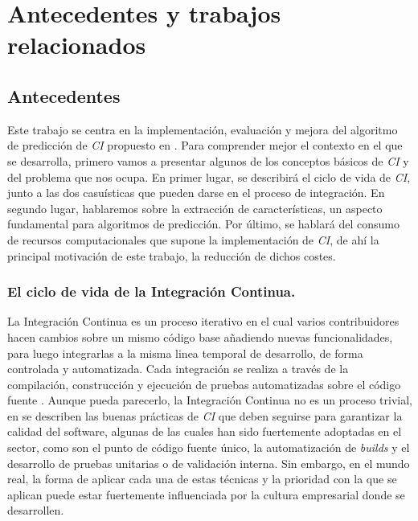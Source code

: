 \section{Antecedentes y trabajos relacionados}
\subsection{Antecedentes}
Este trabajo se centra en la implementación, evaluación y mejora del algoritmo de predicción de
\textit{CI} propuesto en \cite{2}. Para comprender mejor el contexto en el que se desarrolla,
primero vamos a presentar algunos de los conceptos básicos de \textit{CI} y del problema que
nos ocupa. En primer lugar, se describirá el ciclo de vida de \textit{CI}, junto a las dos
casuísticas que pueden darse en el proceso de integración. En segundo lugar, hablaremos sobre la
extracción de características, un aspecto fundamental para algoritmos de predicción. Por último,
se hablará del consumo de recursos computacionales que supone la implementación de \textit{CI},
de ahí la principal motivación de este trabajo, la reducción de dichos costes.


\subsubsection{El ciclo de vida de la Integración Continua.}
La Integración Continua es un proceso iterativo en el cual varios contribuidores hacen cambios
sobre un mismo código base añadiendo nuevas funcionalidades, para luego integrarlas a la misma
linea temporal de desarrollo, de forma controlada y automatizada. Cada integración se realiza
a través de la compilación, construcción y ejecución de pruebas automatizadas sobre el código
fuente \cite{14}. Aunque pueda parecerlo, la Integración Continua no es un proceso trivial, en
\cite{15} se describen las buenas prácticas de \textit{CI} que deben seguirse para garantizar
la calidad del software, algunas de las cuales han sido fuertemente adoptadas en el sector, como
son el punto de código fuente único, la automatización de \textit{builds} y el desarrollo de
pruebas unitarias o de validación interna. Sin embargo, en el mundo real, la forma de aplicar
cada una de estas técnicas y la prioridad con la que se aplican puede estar fuertemente
influenciada \cite{9} por la cultura empresarial donde se desarrollen.\\

